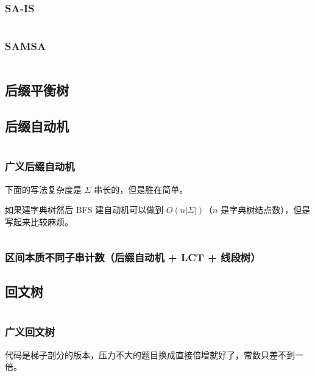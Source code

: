 \documentclass[a4paper, twoside]{article}
\begin{document}
\begin{multicols}{2}
				\subsubsection{SA-IS}
					\inputminted{cpp}{../src/string/sais.cpp}
			
				\subsubsection{SAMSA}
				 	\inputminted{cpp}{../src/string/SAMSA.cpp}

			\subsection{后缀平衡树}
				

			\subsection[后缀自动机 SAM]{后缀自动机}
				\inputminted{cpp}{../src/string/后缀自动机.cpp}

				\subsubsection{广义后缀自动机}
				下面的写法复杂度是 $\Sigma$ 串长的，但是胜在简单。
				
				如果建字典树然后 BFS 建自动机可以做到 $O\left(n\left|\Sigma\right|\right)$（$n$ 是字典树结点数），但是写起来比较麻烦。
				\inputminted{cpp}{../src/string/广义后缀自动机.cpp}

				\subsubsection[区间本质不同子串计数]{区间本质不同子串计数（后缀自动机 + LCT + 线段树）}
					

			\subsection[回文树 PAM]{回文树}
				\inputminted{cpp}{../src/string/回文树.cpp}

				\subsubsection{广义回文树}
					代码是梯子剖分的版本，压力不大的题目换成直接倍增就好了，常数只差不到一倍。
					\inputminted{cpp}{../src/string/广义回文树.cpp}


\end{multicols}
\end{document}
